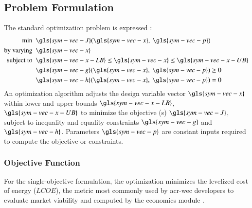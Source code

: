 \subsection{Problem Formulation}\label{remdo:sec:formulation}
The standard optimization problem is expressed \citep{martins_engineering_2022,papalambros_principles_2017}:
\begin{equation}
\label{remdo:eq:standard-opt-prob}
\begin{aligned}
    \text{min}~~& \gls{sym-vec-J} (\gls{sym-vec-x},~\gls{sym-vec-p}) \\
    \text{by varying}~~&\gls{sym-vec-x} \\
    \text{subject to}~~ &\gls{sym-vec-x-LB} \leq \gls{sym-vec-x} \leq \gls{sym-vec-x-UB} \\
    &\gls{sym-vec-g} (\gls{sym-vec-x},~\gls{sym-vec-p}) \geq 0\\
    &\gls{sym-vec-h} (\gls{sym-vec-x},~\gls{sym-vec-p})= 0\\
\end{aligned}
\end{equation}
An optimization algorithm adjusts the design variable vector $\gls{sym-vec-x}$ within lower and upper bounds $\gls{sym-vec-x-LB}$, $\gls{sym-vec-x-UB}$ to minimize the objective (s) $\gls{sym-vec-J}$, subject to inequality and equality constraints $\gls{sym-vec-g}$ and $\gls{sym-vec-h}$.
Parameters $\gls{sym-vec-p}$ are constant inputs required to compute the objective or constraints.

\subsubsection{Objective Function}\label{remdo:sec:obj}
For the single-objective formulation, the optimization minimizes the levelized cost of energy ($LCOE$), the metric most commonly used by \gls{acr-wec} developers to evaluate market viability \citep{trueworthy_wave_2020} and computed by the economics module \citep{mccabe_development_2026}.

